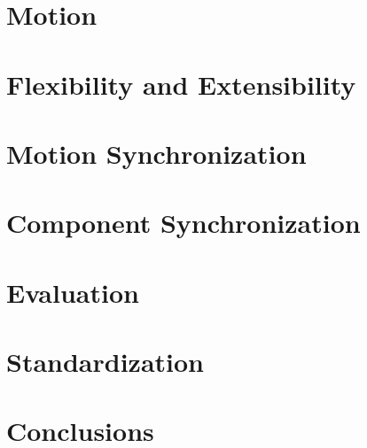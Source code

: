 \documentclass[graybox]{svmult}
\begin{document}
\section{Motion}
\label{sec:motion}


\section{Flexibility and Extensibility}
\label{sec:flexibility}


\section{Motion Synchronization}
\label{sec:motionsync}


\section{Component Synchronization}
\label{sec:compsync}


\section{Evaluation}
\label{sec:eval}


\section{Standardization}
\label{sec:standard}


\section{Conclusions}
\label{sec:concl}



 
\end{document}
